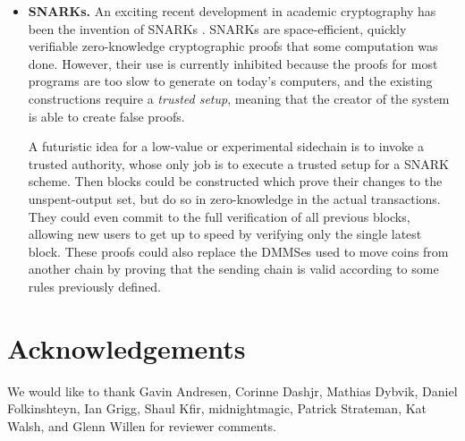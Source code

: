 \documentclass[letterpaper]{article}
\newcommand{\sidechain}{sidechain\xspace}
\newcommand{\hashsigs}{DMMSes\xspace}
\begin{document}
\begin{itemize}
\item \textbf{SNARKs.} An exciting recent development in academic cryptography has been the invention of
SNARKs \cite{ben-sasson+chiesa+genkin+tromer+virza2013}. SNARKs are space-efficient,
quickly verifiable zero-knowledge cryptographic proofs that some computation was done.
However, their use is currently inhibited because the proofs for most programs are too slow to generate on today's
computers, and the existing constructions require a \emph{trusted setup}, meaning that the creator of the system
is able to create false proofs.

A futuristic idea for a low-value or experimental \sidechain is to invoke a trusted authority,
whose only job is to execute a trusted setup for a SNARK scheme. Then blocks could be constructed
which prove their changes to the unspent-output set, but do so in zero-knowledge in the
actual transactions. They could even commit to the full verification of all previous
blocks, allowing new users to get up to speed by verifying only the single latest block.
These proofs could also replace the \hashsigs used to move coins from another chain by
proving that the sending chain is valid according to some rules previously defined.
\end{itemize}

\section{Acknowledgements}

We would like to thank Gavin Andresen, Corinne Dashjr, Mathias Dybvik, Daniel Folkinshteyn, Ian Grigg, Shaul Kfir,
midnightmagic, Patrick Strateman, Kat Walsh, and Glenn Willen for reviewer
comments.
\end{document}
